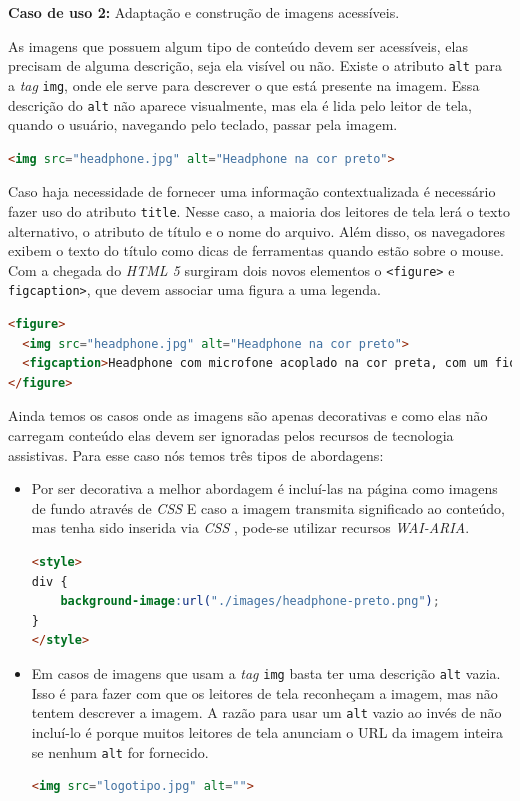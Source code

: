 {\begin{itemize}
\vspace*{50px}
{\textbf{Caso de uso 2:} Adaptação e construção de imagens acessíveis. 
\item As imagens que possuem algum tipo de conteúdo devem ser acessíveis, elas precisam de alguma descrição, seja ela visível ou não. Existe o atributo \lstinline{alt} para a \textit{tag} \lstinline{img}, onde ele serve para descrever o que está presente na imagem. Essa descrição do \lstinline{alt} não aparece visualmente, mas ela é lida pelo leitor de tela, quando o usuário, navegando pelo teclado, passar pela imagem.}
{\begin{lstlisting}[language=html,caption=usando atributo alt]
<img src="headphone.jpg" alt="Headphone na cor preto"> 
\end{lstlisting}}
\item Caso haja necessidade de fornecer uma informação contextualizada é necessário fazer uso do atributo \lstinline{title}. Nesse caso, a maioria dos leitores de tela lerá o texto alternativo, o atributo de título e o nome do arquivo. Além disso, os navegadores exibem o texto do título como dicas de ferramentas quando estão sobre o mouse. Com a chegada do \textit{HTML 5} \cite{HTML} surgiram dois novos elementos o \lstinline{<figure>} e \lstinline{figcaption>}, que devem associar uma figura a uma legenda. 
{\begin{lstlisting}[language=html,caption=usando atributo alt]
<figure>
  <img src="headphone.jpg" alt="Headphone na cor preto"> 
  <figcaption>Headphone com microfone acoplado na cor preta, com um fio de ótima construção</figcaption>
</figure>
\end{lstlisting}}

\item  Ainda temos os casos onde as imagens são apenas decorativas e como elas não carregam conteúdo elas devem ser ignoradas pelos recursos de tecnologia assistivas. Para esse caso nós temos três tipos de abordagens: 
\begin{itemize}
\item Por ser decorativa a melhor abordagem é incluí-las na página como imagens de fundo através de \textit{CSS} \cite{CSS} E caso a imagem transmita significado ao conteúdo, mas tenha sido inserida via \textit{CSS} \cite{CSS}, pode-se utilizar recursos \textit{WAI-ARIA}\cite{WAI-ARIA}.
{\begin{lstlisting}[language=html,caption=adicionando imagem via CSS]
<style>
div {
    background-image:url("./images/headphone-preto.png");
}
</style>
\end{lstlisting}}
\item Em casos de imagens que usam a \textit{tag} \lstinline{img} basta ter uma descrição \lstinline{alt} vazia. Isso é para fazer com que os leitores de tela reconheçam a imagem, mas não tentem descrever a imagem. A razão para usar um \lstinline{alt} vazio ao invés de não incluí-lo é porque muitos leitores de tela anunciam o URL da imagem inteira se nenhum \lstinline{alt} for fornecido.
{\begin{lstlisting}[language=html,caption=usando atributo alt vazio]
<img src="logotipo.jpg" alt=""> 
\end{lstlisting}}


\end{itemize}
\end{itemize}}
